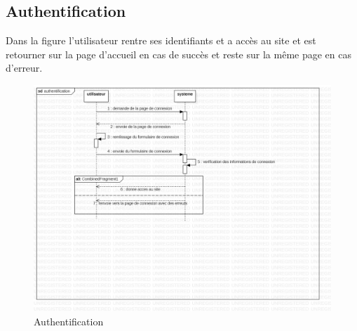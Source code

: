 \documentclass[11pt,a4paper]{report}
\begin{document}
 \subsection{Authentification}
Dans la figure l'utilisateur rentre ses identifiants et a accès au site et est retourner sur la page d'accueil en cas de succès et reste sur la même page en cas d'erreur. 
\begin{center}
 \begin{figure}[H]
 \includegraphics[width=\linewidth]{img/jpg/safeprivacing2.jpg}
 \caption{Authentification}
 \label{fig:diagram2}
 \end{figure}
 \end{center}
 
 \newpage
\end{document}
